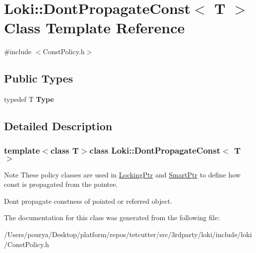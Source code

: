 \hypertarget{structLoki_1_1DontPropagateConst}{}\section{Loki\+:\+:Dont\+Propagate\+Const$<$ T $>$ Class Template Reference}
\label{structLoki_1_1DontPropagateConst}


{\ttfamily \#include $<$Const\+Policy.\+h$>$}

\subsection*{Public Types}
\begin{DoxyCompactItemize}
\item 
\hypertarget{structLoki_1_1DontPropagateConst_afcb44946813827fa350bc4428d8fef1d}{}typedef T {\bfseries Type}\label{structLoki_1_1DontPropagateConst_afcb44946813827fa350bc4428d8fef1d}

\end{DoxyCompactItemize}


\subsection{Detailed Description}
\subsubsection*{template$<$class T$>$class Loki\+::\+Dont\+Propagate\+Const$<$ T $>$}

\begin{DoxyNote}{Note}
These policy classes are used in \hyperlink{classLoki_1_1LockingPtr}{Locking\+Ptr} and \hyperlink{classLoki_1_1SmartPtr}{Smart\+Ptr} to define how const is propagated from the pointee.
\end{DoxyNote}
Don\textquotesingle{}t propagate constness of pointed or referred object. 

The documentation for this class was generated from the following file\+:\begin{DoxyCompactItemize}
\item 
/\+Users/pourya/\+Desktop/platform/repos/tetcutter/src/3rdparty/loki/include/loki/Const\+Policy.\+h\end{DoxyCompactItemize}
